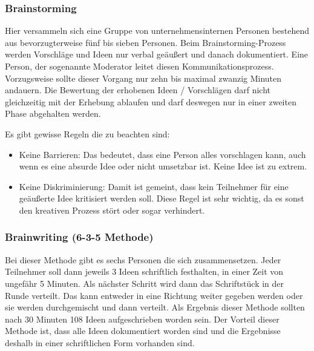 \subsubsection{Brainstorming}
Hier versammeln sich eine Gruppe von unternehmensinternen Personen bestehend aus bevorzugterweise fünf bis sieben Personen. 
Beim Brainstorming-Prozess werden Vorschläge und Ideen nur verbal geäußert und danach dokumentiert. Eine Person, der sogenannte Moderator leitet diesen Kommunikationsprozess. Vorzugsweise sollte dieser Vorgang nur zehn bis maximal zwanzig Minuten andauern.
Die Bewertung der erhobenen Ideen / Vorschlägen darf nicht gleichzeitig mit der Erhebung ablaufen und darf deswegen nur in einer zweiten Phase abgehalten werden.

Es gibt gewisse Regeln die zu beachten sind:
\begin{itemize}
	\item Keine Barrieren: Das bedeutet, dass eine Person alles vorschlagen kann, auch wenn es eine absurde Idee oder nicht umsetzbar ist. Keine Idee ist zu extrem.
	\item Keine Diskriminierung: Damit ist gemeint, dass kein Teilnehmer für eine geäußerte Idee kritisiert werden soll. Diese Regel ist sehr wichtig, da es sonst den kreativen Prozess stört oder sogar verhindert.
\end{itemize}

\subsubsection{Brainwriting (6-3-5 Methode)}
Bei dieser Methode gibt es sechs Personen die sich zusammensetzen. Jeder Teilnehmer soll dann jeweils 3 Ideen schriftlich festhalten, in einer Zeit von ungefähr 5 Minuten.
Als nächster Schritt wird dann das Schriftstück in der Runde verteilt. Das kann entweder in eine Richtung weiter gegeben werden oder sie werden durchgemischt und dann verteilt. 
Als Ergebnis dieser Methode sollten nach 30 Minuten 108 Ideen aufgeschrieben worden sein.
Der Vorteil dieser Methode ist, dass alle Ideen dokumentiert worden sind und die Ergebnisse deshalb in einer schriftlichen Form vorhanden sind.

